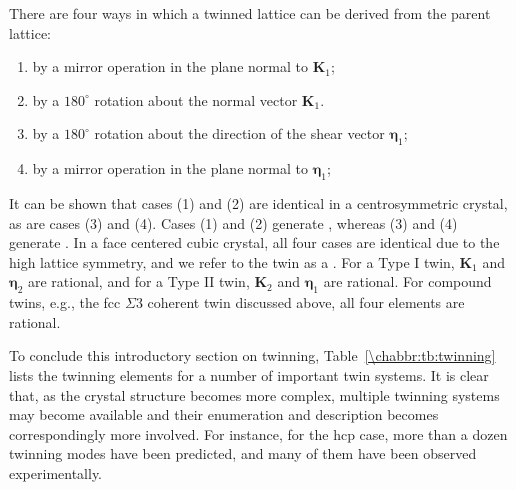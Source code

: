 \noindent There are four ways in which a twinned lattice can be derived from the parent lattice:  
\begin{enumerate}
	\item by a mirror operation in the plane normal to $\mathbf{K}_1$;
	\item by a $180^{\circ}$ rotation about the normal vector $\mathbf{K}_1$. 
	\item by a $180^{\circ}$ rotation about the direction of the shear vector $\bm{\eta}_1$;
	\item by a mirror operation in the plane normal to $\bm{\eta}_1$;
\end{enumerate}
It can be shown that cases (1) and (2) are identical in a centrosymmetric crystal, as are cases (3) and (4).  Cases (1) and (2) generate , whereas (3) and (4) generate .  In a face centered cubic crystal, all four cases are identical due to the high lattice symmetry, and we refer to the twin as a .  For a Type I twin, $\mathbf{K}_1$ and $\bm{\eta}_2$ are rational, and for a Type II twin, $\mathbf{K}_2$ and $\bm{\eta}_1$ are rational. For compound twins, e.g., the fcc $\Sigma 3$ coherent twin discussed above, all four elements are rational.  

To conclude this introductory section on twinning, Table~\ref{\chabbr:tb:twinning} lists the twinning elements for a number of important twin systems.  It is clear that, as the crystal structure becomes more complex, multiple twinning systems may become available and their enumeration and description becomes correspondingly more involved.  For instance, for the hcp case, more than a dozen twinning modes have been predicted, and many of them have been observed experimentally.

